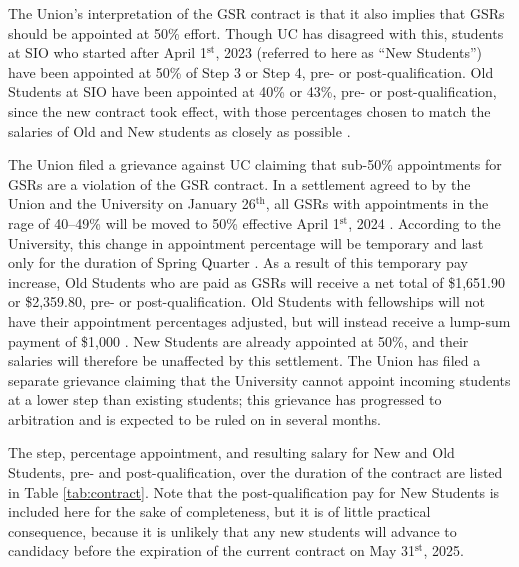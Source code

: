 \documentclass{article}
\begin{document}
The Union's interpretation of the GSR contract is that it also implies that GSRs should be appointed at 50\% effort. Though UC has disagreed with this, students at SIO who started after April 1$^\text{st}$, 2023 (referred to here as ``New Students'') have been appointed at 50\% of Step 3 or Step 4, pre- or post-qualification. Old Students at SIO have been appointed at 40\% or 43\%, pre- or post-qualification, since the new contract took effect, with those percentages chosen to match the salaries of Old and New students as closely as possible \citep{salary_implementation_email}.

The Union filed a grievance against UC claiming that sub-50\% appointments for GSRs are a violation of the GSR contract. In a settlement agreed to by the Union and the University on January 26$^\text{th}$, all GSRs with appointments in the rage of 40--49\% will be moved to 50\% effective April 1$^\text{st}$, 2024 \citep{uc_uaw_page}. According to the University, this change in appointment percentage will be temporary and last only for the duration of Spring Quarter \citep{uc_uaw_page}. As a result of this temporary pay increase, Old Students who are paid as GSRs will receive a net total of \$1,651.90 or \$2,359.80, pre- or post-qualification. Old Students with fellowships will not have their appointment percentages adjusted, but will instead receive a lump-sum payment of \$1,000 \citep{uc_uaw_page}. New Students are already appointed at 50\%, and their salaries will therefore be unaffected by this settlement. The Union has filed a separate grievance claiming that the University cannot appoint incoming students at a lower step than existing students; this grievance has progressed to arbitration and is expected to be ruled on in several months.

The step, percentage appointment, and resulting salary for New and Old Students, pre- and post-qualification, over the duration of the contract are listed in Table \ref{tab:contract}. Note that the post-qualification pay for New Students is included here for the sake of completeness, but it is of little practical consequence, because it is unlikely that any new students will advance to candidacy before the expiration of the current contract on May 31$^\text{st}$, 2025.
\end{document}
